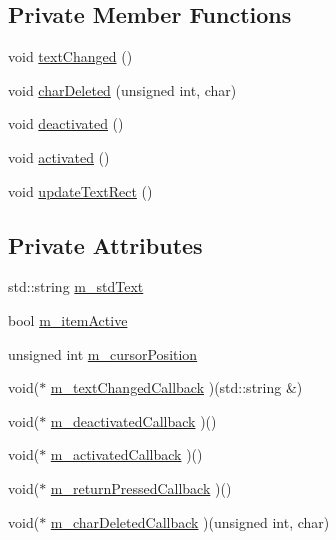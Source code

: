 \subsection*{Private Member Functions}
\begin{CompactItemize}
\item 
void \hyperlink{classsfgui_1_1TextEdit_04bf790d96e0014479cc791691ecbade}{textChanged} ()
\item 
void \hyperlink{classsfgui_1_1TextEdit_8c3d822835999b2b0a38c1ef95eca4ff}{charDeleted} (unsigned int, char)
\item 
void \hyperlink{classsfgui_1_1TextEdit_c5ff761e3933294b46892db32e62b9f6}{deactivated} ()
\item 
void \hyperlink{classsfgui_1_1TextEdit_c009c601675801f2039d8f526e6fc921}{activated} ()
\item 
void \hyperlink{classsfgui_1_1TextEdit_cd1f4ab301db3775216a85066859a647}{updateTextRect} ()
\end{CompactItemize}
\subsection*{Private Attributes}
\begin{CompactItemize}
\item 
std::string \hyperlink{classsfgui_1_1TextEdit_08de851a32aa8dd650e33dfcb376bfd8}{m\_\-stdText}
\item 
bool \hyperlink{classsfgui_1_1TextEdit_8ffa5546b2fd4901837b13a118f9beef}{m\_\-itemActive}
\item 
unsigned int \hyperlink{classsfgui_1_1TextEdit_9392f92ba9efe59f56801ec3c0e52ccb}{m\_\-cursorPosition}
\item 
void($\ast$ \hyperlink{classsfgui_1_1TextEdit_a6d415ef1daf7f9fdf0dec3d71cb8eab}{m\_\-textChangedCallback} )(std::string \&)
\item 
void($\ast$ \hyperlink{classsfgui_1_1TextEdit_bfa97d7c95f54cc91600375242fe1ea6}{m\_\-deactivatedCallback} )()
\item 
void($\ast$ \hyperlink{classsfgui_1_1TextEdit_9cf910f9fca635f595d6a8963d7e30d1}{m\_\-activatedCallback} )()
\item 
void($\ast$ \hyperlink{classsfgui_1_1TextEdit_d86f9eaadf1313214631b2de009abf55}{m\_\-returnPressedCallback} )()
\item 
void($\ast$ \hyperlink{classsfgui_1_1TextEdit_1538508447c54b9f997fc8a68eb5c097}{m\_\-charDeletedCallback} )(unsigned int, char)
\end{CompactItemize}


